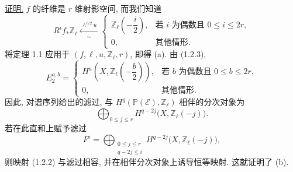\noindent\underline{证明.}
$f$ 的纤维是 $r$ 维射影空间, 而我们知道
\begin{equation}\tag{1.2.3}
R^if_*\mathbb Z_\ell
\xleftarrow[\ \sim\ ]{\ \wedge^{i/2}u\ }
\begin{cases}
\mathbb Z_\ell\left(-\dfrac{i}{2}\right),
  & \text{若 $i$ 为偶数且 $0\leq i\leq2r$},\\[2ex]
0, & \text{其他情形}.
\end{cases}
\end{equation}
将定理 1.1 应用于 $(f,\ell,u,\mathbb Z_\ell,r)$, 即得 (a). 由 (1.2.3),
\begin{equation}\tag{1.2.4}
E_2^{a,b}=
\begin{cases}
H^a\left(X,\mathbb Z_\ell\left(-\dfrac b2\right)\right),
  & \text{若 $b$ 为偶数且 $0\leq b\leq2r$},\\[2ex]
0, & \text{其他情形}.
\end{cases}
\end{equation}
因此, 对谱序列给出的滤过, 与 $H^q(\mathbb P(\mathcal E),\mathbb Z_\ell)$ 相伴的分次对象为
\[
\bigoplus_{0\leq j\leq r}
H^{q-2j}\bigl(X,\mathbb Z_\ell(-j)\bigr).
\]
若在此直和上赋予滤过
\[
F^i=
\bigoplus_{\substack{0\leq j\leq r\\q-2j\leq i}}
H^{q-2j}\bigl(X,\mathbb Z_\ell(-j)\bigr),
\]
则映射 (1.2.2) 与滤过相容, 并在相伴分次对象上诱导恒等映射. 这就证明了 (b).

